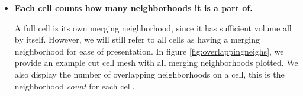 \begin{itemize}

\item
{\bf Each cell counts how many neighborhoods it is a part of.}

\vspace*{.1in}
A full cell is its own merging neighborhood, since it has sufficient
volume all by itself. However, we will still refer to all cells as having a
merging neighborhood for ease of presentation.  In figure \ref{fig:overlappingneighs}, we provide an example cut cell mesh with all merging neighborhoods plotted.  We also display the number of overlapping neighborhoods on a cell, this is the neighborhood {\em count} for each cell.
\begin{figure}
	\hfill
	\hfill
    \hfill

\end{figure}
\end{itemize}
